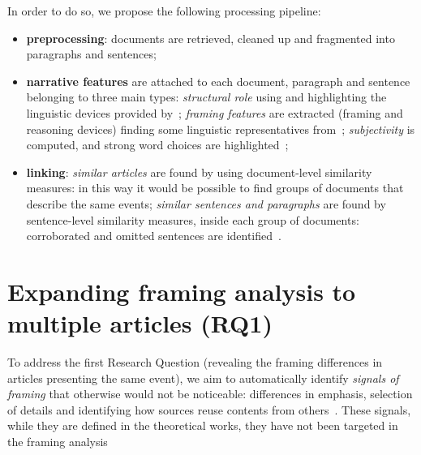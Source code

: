 In order to do so, we propose the following processing pipeline:
\begin{itemize}
    \item \textbf{preprocessing}: documents are retrieved, cleaned up and fragmented into paragraphs and sentences;
    \item \textbf{narrative features} are attached to each document, paragraph and sentence belonging to three main types:
    \emph{structural role} using and highlighting the linguistic devices provided by~\cite{zahid2019towards};
    \emph{framing features} are extracted (framing and reasoning devices) finding some linguistic representatives from~\cite{gamson1989media,fillmore2006frame};
    \emph{subjectivity} is computed, and strong word choices are highlighted~\cite{liu2010sentiment};
    \item \textbf{linking}: \emph{similar articles} are found by using document-level similarity measures: in this way it would be possible to find groups of documents that describe the same events; \emph{similar sentences and paragraphs} are found by sentence-level similarity measures, inside each group of documents: corroborated and omitted sentences are identified~\cite{bountouridis2018explaining}.
\end{itemize}



\section{Expanding framing analysis to multiple articles (RQ1)}
\label{sec:prop_rq1}

To address the first Research Question (revealing the framing differences in articles presenting the same event), we aim to automatically identify \textit{signals of framing} that otherwise would not be noticeable: %
differences in emphasis, selection of details and identifying how sources reuse contents from others~\cite{mensio2020towards}.
These signals, while they are defined in the theoretical works, they have not been targeted in the framing analysis

